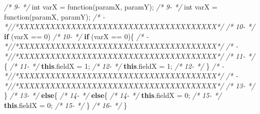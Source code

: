 \documentclass[
]{article}
\newenvironment{Shaded}{\begin{snugshade}}{\end{snugshade}}
\newcommand{\CommentTok}[1]{\textcolor[rgb]{0.56,0.35,0.01}{\textit{#1}}}
\newcommand{\DataTypeTok}[1]{\textcolor[rgb]{0.13,0.29,0.53}{#1}}
\newcommand{\DecValTok}[1]{\textcolor[rgb]{0.00,0.00,0.81}{#1}}
\newcommand{\FunctionTok}[1]{\textcolor[rgb]{0.00,0.00,0.00}{#1}}
\newcommand{\KeywordTok}[1]{\textcolor[rgb]{0.13,0.29,0.53}{\textbf{#1}}}
\newcommand{\NormalTok}[1]{#1}
\begin{document}
\begin{landscape}
\begin{Shaded}
\begin{Highlighting}[]
\CommentTok{/*  9-                 */}        \DataTypeTok{int}\NormalTok{ varX = }\FunctionTok{function}\NormalTok{(paramX, paramY);                          }\CommentTok{/*  9-                 */}        \DataTypeTok{int}\NormalTok{ varX = }\FunctionTok{function}\NormalTok{(paramX, paramY);                           }
\CommentTok{/*   -                 *//*XXXXXXXXXXXXXXXXXXXXXXXXXXXXXXXXXXXXXX*/}                     \CommentTok{/* 10-                 */}        \KeywordTok{if}\NormalTok{ (varX == }\DecValTok{0}\NormalTok{)                                         }
\CommentTok{/* 10-                 */}        \KeywordTok{if}\NormalTok{ (varX == }\DecValTok{0}\NormalTok{)\{                                        }\CommentTok{/*   -                 *//*XXXXXXXXXXXXXXXXXXXXXXXXXXXXXXXXXXXXXX*/}                     
\CommentTok{/*   -                 *//*XXXXXXXXXXXXXXXXXXXXXXXXXXXXXXXXXXXXXX*/}                     \CommentTok{/* 11-                 */}\NormalTok{        \{                                                      }
\CommentTok{/* 11-                 */}            \KeywordTok{this}\NormalTok{.}\FunctionTok{fieldX}\NormalTok{ = }\DecValTok{1}\NormalTok{;                                   }\CommentTok{/* 12-                 */}            \KeywordTok{this}\NormalTok{.}\FunctionTok{fieldX}\NormalTok{ = }\DecValTok{1}\NormalTok{;                                   }
\CommentTok{/* 12-                 */}\NormalTok{        \}                                                      }\CommentTok{/*   -                 *//*XXXXXXXXXXXXXXXXXXXXXXXXXXXXXXXXXXXXXX*/}                     
\CommentTok{/*   -                 *//*XXXXXXXXXXXXXXXXXXXXXXXXXXXXXXXXXXXXXX*/}                     \CommentTok{/* 13-                 */}\NormalTok{        \}                                                                }
\CommentTok{/* 13-                 */}        \KeywordTok{else}\NormalTok{\{                                                  }\CommentTok{/* 14-                 */}        \KeywordTok{else}\NormalTok{\{                                                  }
\CommentTok{/* 14-                 */}            \KeywordTok{this}\NormalTok{.}\FunctionTok{fieldX}\NormalTok{ = }\DecValTok{0}\NormalTok{;                                   }\CommentTok{/* 15-                 */}            \KeywordTok{this}\NormalTok{.}\FunctionTok{fieldX}\NormalTok{ = }\DecValTok{0}\NormalTok{;                                   }
\CommentTok{/* 15-                 */}\NormalTok{        \}                                                      }\CommentTok{/* 16-                 */}\NormalTok{        \}                                                      }

\end{Highlighting}
\end{Shaded}
\end{landscape}
\end{document}
